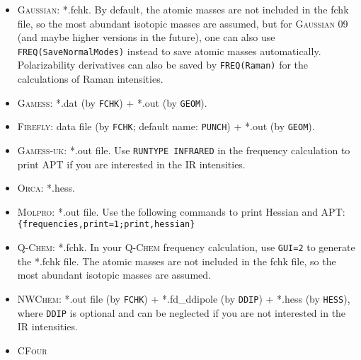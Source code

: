 \documentclass[12pt,english]{extarticle}
\begin{document}
\begin{itemize}
\item \textsc{Gaussian}: *.fchk. By default, the atomic masses are not included in the fchk file, so the most abundant isotopic masses are assumed, but for \textsc{Gaussian} 09 (and maybe higher versions in the future), one can also use \texttt{FREQ(SaveNormalModes)} instead to save atomic masses automatically. Polarizability derivatives can also be saved by \texttt{FREQ(Raman)} for the calculations of Raman intensities.
\item \textsc{Gamess}: *.dat (by \verb|FCHK|) + *.out (by \verb|GEOM|).
\item \textsc{Firefly}: data file (by \verb|FCHK|; default name: \verb|PUNCH|) + *.out (by \verb|GEOM|).
\item \textsc{Gamess-uk}: *.out file. Use \texttt{RUNTYPE INFRARED} in the frequency calculation to
print APT if you are interested in the IR intensities.
\item \textsc{Orca}: *.hess.
\item \textsc{Molpro}: *.out file. Use the following commands to print Hessian and APT: \\
\verb|{frequencies,print=1;print,hessian}|
\item \textsc{Q-Chem}: *.fchk. In your \textsc{Q-Chem} frequency calculation, use \texttt{GUI=2} to
generate the *.fchk file. The atomic masses are not included in the fchk
file, so the most abundant isotopic masses are assumed.
\item \textsc{NWChem}: *.out file (by \verb|FCHK|) + *.fd{\_}ddipole (by \verb|DDIP|) +
*.hess (by \verb|HESS|), where \verb|DDIP| is optional and can be
neglected if you are not interested in the IR intensities.
\item \textsc{CFour}
\end{itemize}
\end{document}
